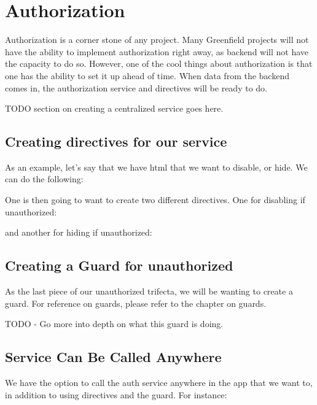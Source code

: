 \maketitle{}
\section{ Authorization }

Authorization is a corner stone of any project. Many Greenfield projects will
not have the ability to implement authorization right away, as backend will not
have the capacity to do so. However, one of the cool things about authorization
is that one has the ability to set it up ahead of time. When data from the
backend comes in, the authorization service and directives will be ready to do.

TODO section on creating a centralized service goes here.

\subsection{Creating directives for our service}
As an example, let's say that we have html that we want to disable, or hide. We
can do the following:


One is then going to want to create two different directives. One for disabling
if unauthorized:

and another for hiding if unauthorized:


\subsection{Creating a Guard for unauthorized}
As the last piece of our unauthorized trifecta, we will be wanting to create a
guard. For reference on guards, please refer to the chapter on guards.

TODO - Go more into depth on what this guard is doing.


\subsection{Service Can Be Called Anywhere}
We have the option to call the auth service anywhere in the app that we want to,
in addition to using directives and the guard. For instance:


